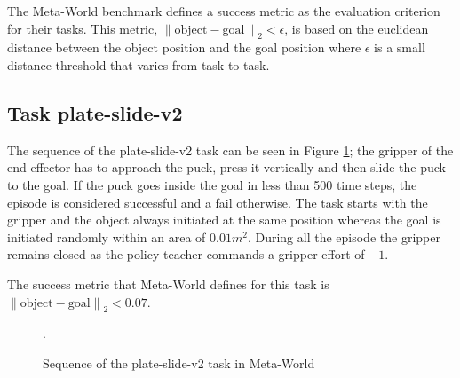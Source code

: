 The Meta-World benchmark defines a success metric as the evaluation criterion for their tasks. This metric, ${\left\lVert \text{object}-\text{goal} \right\rVert}_2 < \epsilon$, is based on the euclidean distance between the object position and the goal position where $\epsilon$ is a small distance threshold that varies from task to task.




\subsection{Task plate-slide-v2}
\label{subsection:metaworld-hockey-task}

The sequence of the plate-slide-v2 task can be seen in Figure \ref{fig:sequence-plate-slide}; the gripper of the end effector has to approach the puck, press it vertically and then slide the puck to the goal. If the puck goes inside the goal in less than 500 time steps, the episode is considered successful and a fail otherwise. The task starts with the gripper and the object always initiated at the same position whereas the goal is initiated randomly within an area of  $0.01m^2$. During all the episode the gripper remains closed as the policy teacher commands a gripper effort of $-1$.


The success metric that Meta-World defines for this task is ${\left\lVert \text{object}-\text{goal} \right\rVert}_2 < 0.07$.

 \begin{figure}[H]
  \centering
  \hspace*{\fill}%
   \hfill
   \hfill
  \hspace*{\fill}%
  \caption{Sequence of the plate-slide-v2 task in Meta-World}.
  \label{fig:sequence-plate-slide}
\end{figure}



